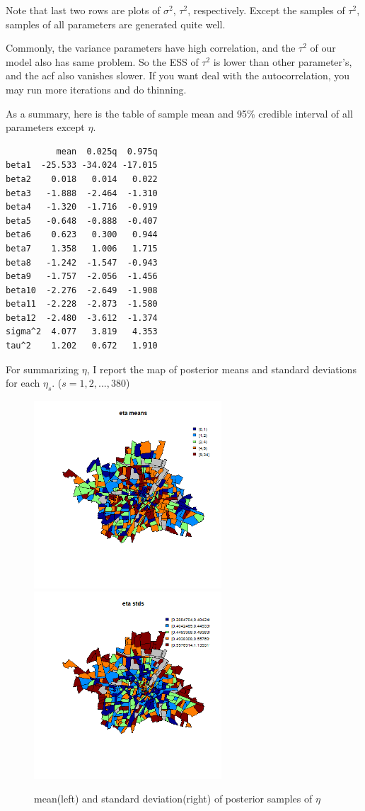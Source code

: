 \documentclass{article}
\begin{document}
\clearpage
Note that last two rows are plots of $\sigma^2$, $\tau^2$, respectively.
Except the samples of $\tau^2$, samples of all parameters are generated quite well.

Commonly, the variance parameters have high correlation, and the $\tau^2$ of our model also has same problem.
So the ESS of $\tau^2$ is lower than other parameter's, and the acf also vanishes slower. 
If you want deal with the autocorrelation, you may run more iterations and do thinning.

As a summary, here is the table of sample mean and 95\% credible interval of all parameters except $\eta$.
\begin{verbatim}
          mean  0.025q  0.975q
beta1  -25.533 -34.024 -17.015
beta2    0.018   0.014   0.022
beta3   -1.888  -2.464  -1.310
beta4   -1.320  -1.716  -0.919
beta5   -0.648  -0.888  -0.407
beta6    0.623   0.300   0.944
beta7    1.358   1.006   1.715
beta8   -1.242  -1.547  -0.943
beta9   -1.757  -2.056  -1.456
beta10  -2.276  -2.649  -1.908
beta11  -2.228  -2.873  -1.580
beta12  -2.480  -3.612  -1.374
sigma^2  4.077   3.819   4.353
tau^2    1.202   0.672   1.910
\end{verbatim}

For summarizing $\eta$, I report the map of posterior means and standard deviations for each $\eta_s$.
($s=1,2,...,380$)
\begin{figure}[!h]
    \centering
    \includegraphics[width=7cm]{map_posterior_eta_means.png}
    \includegraphics[width=7cm]{map_posterior_eta_stds.png}
    \caption{mean(left) and standard deviation(right) of posterior samples of $\eta$}
\end{figure}
\end{document}
